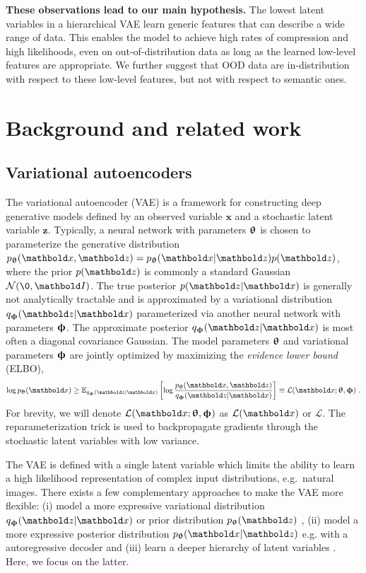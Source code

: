 {\textbf{These observations lead to our main hypothesis.}
The lowest latent variables in a hierarchical VAE learn generic features that can describe a wide range of data.
This enables the model to achieve high rates of compression and high likelihoods, even on out-of-distribution data as long as the learned low-level features are appropriate.
We further suggest that OOD data are in-distribution with respect to these low-level features, but not with respect to semantic ones.

\vspace{0cm}
\section{Background and related work}

\subsection{Variational autoencoders}
The variational autoencoder (VAE) \cite{kingma_autoencoding_2014, rezende_stochastic_2014} is a framework for constructing deep generative models defined by an observed variable $\mathbf{x}$ and a stochastic latent variable $\mathbf{z}$.
Typically, a neural network with parameters ${\boldsymbol{\uptheta}}$ is chosen to parameterize the generative distribution $p_\thetab(\xb,\zb)=p_\thetab(\xb|\zb)p(\zb)$, where the prior $p(\zb)$ is commonly a standard Gaussian $\mathcal{N}(\0, \Ib)$.
The true posterior $p(\zb|\xb)$ is generally not analytically tractable and is approximated by a variational distribution $q_\phib(\zb|\xb)$ parameterized via another neural network with parameters ${\boldsymbol{\upphi}}$. The approximate posterior $q_\phib(\zb|\xb)$ is most often  a diagonal covariance Gaussian.
The model parameters ${\boldsymbol{\uptheta}}$ and variational parameters ${\boldsymbol{\upphi}}$ are jointly optimized by maximizing the \textit{evidence lower bound} (ELBO),
\begin{equation}\label{eq_hierarchical:elbo}
    \log p_\thetab(\xb) \geq \mathbb{E}_{q_\phib(\zb|\xb)} \left[ \log \frac{p_\thetab(\xb,\zb)}{q_\phib(\zb|\xb)} \right] \equiv \mathcal{L}(\xb; \thetab, \phib)\ .
\end{equation}
For brevity, we will denote $\mathcal{L}(\xb; \thetab, \phib)$ as $\mathcal{L}(\xb)$ or $\mathcal{L}$. The reparameterization trick is used to backpropagate gradients through the stochastic latent variables with low variance.

The VAE is defined with a single latent variable which limits the ability to learn a high likelihood representation of complex input distributions, e.g.\ natural images.
There exists a few complementary approaches to make the VAE more flexible: (i) model a more expressive variational distribution $q_\phib(\zb|\xb)$ or prior distribution $p_\thetab(\zb)$ \cite{rezende_variational_2015, kingma_improved_2016}, (ii) model a more expressive posterior distribution $p_\thetab(\xb|\zb)$ e.g. with a autoregressive decoder \cite{oord_conditional_2016} and (iii) learn a deeper hierarchy of latent variables \cite{burda_importance_2016, sonderby_ladder_2016}.
Here, we focus on the latter.


}
